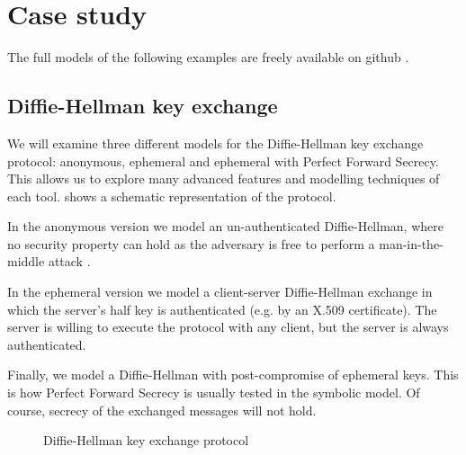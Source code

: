 
\section{Case study}
\label{section:case-study}

The full models of the following examples are freely available on github \cite{CaseStudies}.

\subsection{Diffie-Hellman key exchange}

We will examine three different models for the Diffie-Hellman key exchange protocol: anonymous, ephemeral and ephemeral with Perfect Forward Secrecy. This allows us to explore many advanced features and modelling techniques of each tool.  shows a schematic representation of the protocol.

In the anonymous version we model an un-authenticated Diffie-Hellman, where no security property can hold as the adversary is free to perform a man-in-the-middle attack \cite{MITM-DH}.

In the ephemeral version we model a client-server Diffie-Hellman exchange in which the server's half key is authenticated (e.g. by an X.509 certificate). The server is willing to execute the protocol with any client, but the server is always authenticated.

Finally, we model a Diffie-Hellman with post-compromise of ephemeral keys. This is how Perfect Forward Secrecy \cite{PFS} is usually tested in the symbolic model. Of course, secrecy of the exchanged messages will not hold.

\begin{figure}[t]
    \setmscoptions
    \begin{msc}{}
    
    

    \nextlevel[5]
    \nextlevel


    \nextlevel[6]
    \nextlevel

    \nextlevel

    \end{msc}
    \centering
    \caption{Diffie-Hellman key exchange protocol}
    \label{fig:dh-key-exchange}
\end{figure}

